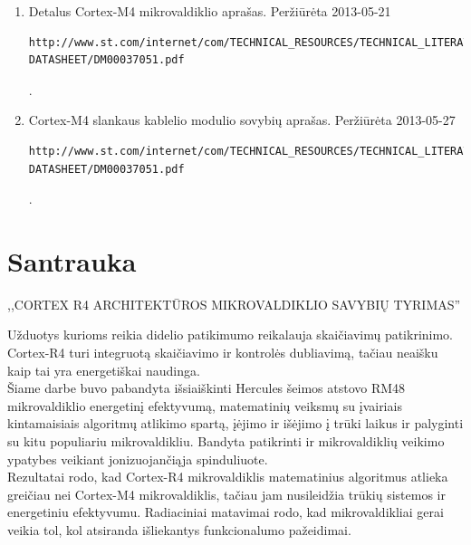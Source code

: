\documentclass[a4paper, 12pt]{article} %
\newcommand{\studentas}{Mindaugas Kurmauskas} %
\newcommand{\pavadinimas}{Cortex R4 architekt\={u}ros mikrovaldiklio savybi\k{u} tyrimas} %
\begin{document}
\begin{onehalfspacing}
\begin{enumerate}
\item Detalus Cortex-M4 mikrovaldiklio apra\v{s}as. Per\v{z}i\={u}r\.{e}ta 2013-05-21 \begin{verbatim}http://www.st.com/internet/com/TECHNICAL_RESOURCES/TECHNICAL_LITERATURE/
DATASHEET/DM00037051.pdf\end{verbatim}. 
\item Cortex-M4 slankaus kablelio modulio sovybi\k{u} apra\v{s}as. Per\v{z}i\={u}r\.{e}ta 2013-05-27 \begin{verbatim}http://www.st.com/internet/com/TECHNICAL_RESOURCES/TECHNICAL_LITERATURE/
DATASHEET/DM00037051.pdf\end{verbatim}. 
\end{enumerate}


\newpage

\section*{Santrauka}




\begin{center}


\MakeUppercase{,,\pavadinimas''}\\

\end{center}

U\v{z}duotys kurioms reikia didelio patikimumo reikalauja skai\v{c}iavim\k{u} patikrinimo. Cortex-R4 turi integruot\k{a} skai\v{c}iavimo ir kontrol\.es dubliavim\k{a}, ta\v{c}iau neai\v{s}ku kaip tai yra energeti\v{s}kai naudinga. \\
\indent
\v{S}iame darbe buvo pabandyta i\v{s}siai\v{s}kinti Hercules \v{s}eimos atstovo RM48 mikrovaldiklio energetin\k{i} efektyvum\k{a}, matematini\k{u} veiksm\k{u} su \k{i}vairiais kintamaisiais algoritm\k{u} atlikimo spart\k{a}, \k{i}\.{e}jimo ir i\v{s}\.{e}jimo \k{i} tr\={u}ki laikus ir palyginti su kitu populiariu mikrovaldikliu. Bandyta patikrinti ir mikrovaldikli\k{u} veikimo ypatybes veikiant jonizuojan\v{c}i\k{a}ja spinduliuote. \\
\indent
Rezultatai rodo, kad Cortex-R4 mikrovaldiklis matematinius algoritmus atlieka grei\v{c}iau nei Cortex-M4 mikrovaldiklis, ta\v{c}iau jam nusileid\v{z}ia tr\={u}ki\k{u} sistemos ir energetiniu efektyvumu. Radiaciniai matavimai rodo, kad mikrovaldikliai gerai veikia tol, kol atsiranda i\v{s}liekantys funkcionalumo pa\v{z}eidimai.  




\end{onehalfspacing}
\end{document}
